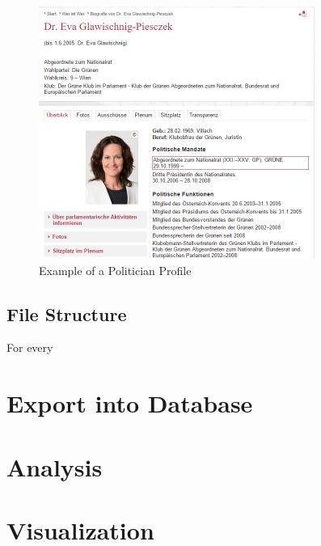 \begin{figure}
	\centering
	\includegraphics[width=341px]{imgs/politician_profile_example}
	\caption{Example of a Politician Profile}
	\label{fig:politician_profile_example}
\end{figure}


\subsection{File Structure}
For every 

\section{Export into Database}
\label{sec:export_db}

\section{Analysis}
\label{sec:analysis}

\section{Visualization}
\label{sec:visualization}
